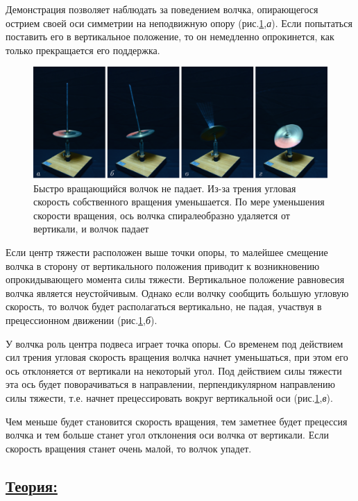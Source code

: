 \documentclass[14pt,a4paper,oneside]{extarticle}	%
\begin{document}
	Демонстрация позволяет наблюдать за поведением волчка, опирающегося острием своей оси симметрии на неподвижную опору (рис.\ref{gyro-5},\textit{а}).
	Если попытаться поставить его в вертикальное положение, то он немедленно опрокинется, как только прекращается его поддержка. 
	\begin{figure}[H] 	
		\centering 	
		\includegraphics[width=0.9\linewidth]{gyro-5.png}
		\caption{Быстро вращающийся волчок не падает. Из-за трения угловая скорость собственного вращения уменьшается. По мере уменьшения скорости вращения, ось волчка спиралеобразно удаляется от вертикали, и волчок падает}
		\label{gyro-5}
	\end{figure}
	Если центр тяжести расположен выше точки опоры, то малейшее смещение волчка в сторону от вертикального положения приводит к возникновению опрокидывающего момента силы тяжести.
	Вертикальное положение равновесия волчка является неустойчивым.
	Однако если волчку сообщить большую угловую скорость, то волчок будет располагаться вертикально, не падая, участвуя в прецессионном движении (рис.\ref{gyro-5},\textit{б}). 



У волчка роль центра подвеса играет точка опоры.
Со временем под действием сил трения угловая скорость вращения волчка начнет уменьшаться, при этом его ось отклоняется от вертикали на некоторый угол.
Под действием силы тяжести эта ось будет поворачиваться в направлении, перпендикулярном направлению силы тяжести, т.е. начнет прецессировать вокруг вертикальной оси (рис.\ref{gyro-5},\textit{в}).



Чем меньше будет становится скорость вращения, тем заметнее будет прецессия волчка и тем больше станет угол отклонения оси волчка от вертикали.
Если скорость вращения станет очень малой, то волчок упадет.

		\subsection*{\underline{Теория:}}
			
\end{document}
